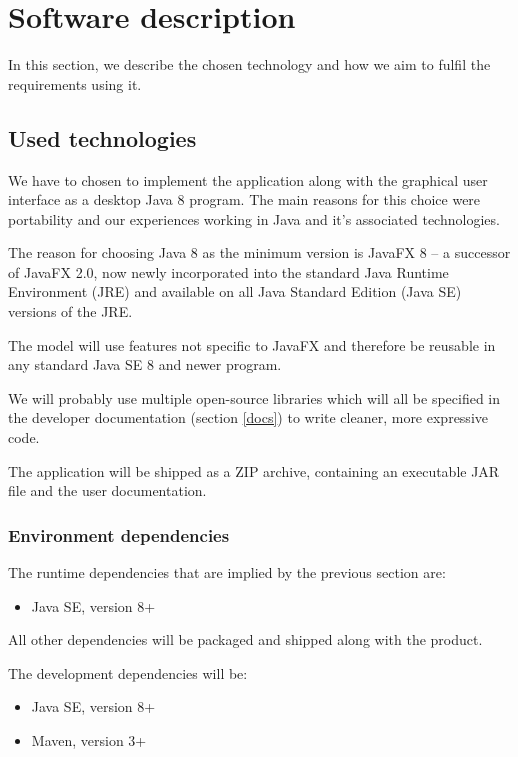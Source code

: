 \documentclass[10pt,a4paper,oneside]{article}
\begin{document}
 
 
 
 



\section{Software description}

In this section, we describe the chosen technology and how we aim to fulfil the requirements using it.

\subsection{Used technologies} \label{used-tech}

We have to chosen to implement the application along with the graphical user interface as a
desktop Java 8 program. The main reasons for this choice were portability and our experiences working in Java and it's associated technologies.

The reason for choosing Java 8 as the minimum version is JavaFX 8 -- a successor of JavaFX 2.0, now newly incorporated into
the standard Java Runtime Environment (JRE) and available on all Java Standard Edition (Java SE) versions of the JRE.

The model will use features not specific to JavaFX and therefore be reusable in any standard Java SE 8 and newer program.

We will probably use multiple open-source libraries which will all be specified in the developer documentation (section \ref{docs})
to write cleaner, more expressive code.

The application will be shipped as a ZIP archive, containing an executable JAR file and the user documentation.

\subsubsection{Environment dependencies}

The runtime dependencies that are implied by the previous section are:
\begin{itemize}
\item Java SE, version 8+
\end{itemize}
All other dependencies will be packaged and shipped along with the product.

The development dependencies will be:
\begin{itemize}
\item Java SE, version 8+
\item Maven, version 3+
\end{itemize}
\end{document}
